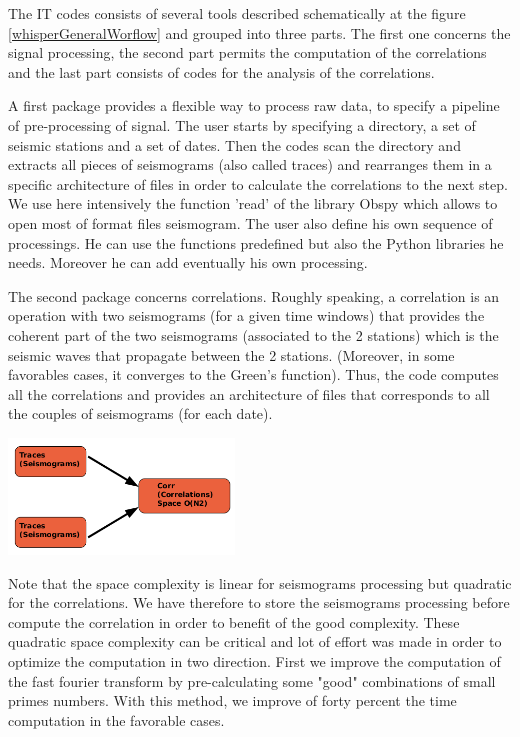 \documentclass[a4paper, 10pt]{article}
\begin{document}
\begin{multicols}{2}
The IT codes consists of several tools described schematically at the figure \ref{whisperGeneralWorflow} and grouped into three parts. The first one concerns the signal processing, the second part permits the computation of the correlations and the last part consists of codes for the analysis of the correlations.

A first package provides a flexible way to process raw data, to specify a pipeline of pre-processing of signal.
The user starts by specifying a directory, a set of seismic stations and a set of dates. Then the codes scan the directory
and extracts all pieces of seismograms (also called traces) and rearranges them in a specific architecture of files in order to calculate the correlations to the next step.
We use here intensively the function 'read' of the library Obspy which allows to open most of format files seismogram.
The user also define his own sequence of processings. He can use the functions predefined but also the Python libraries he needs. 
Moreover he can add eventually his own processing.

The second package concerns correlations. 
Roughly speaking, a correlation is an operation with two seismograms (for a given time windows) that provides the coherent part of the two seismograms 
(associated to the 2 stations) which is the seismic waves that propagate between the 2 stations.
(Moreover, in some favorables cases, it converges to the Green's function). 
Thus, the code computes all the correlations and provides an architecture of files that corresponds to all the couples of seismograms (for each date). 

\begin{center}%
\centering
{}
\includegraphics[width=6cm]{schemaCorrelationStep.png}
\end{center}

Note that the space complexity is linear for seismograms processing but quadratic for the correlations. We have therefore to store the seismograms processing before compute the correlation in order to benefit of the good complexity.
These quadratic space complexity can be critical and lot of effort was made in order to optimize the computation in two direction. First we improve the computation of the fast fourier transform by pre-calculating some "good" combinations of small primes numbers. 
With this method, we improve of forty percent the time computation in the favorable cases.


\end{multicols}
\end{document}

